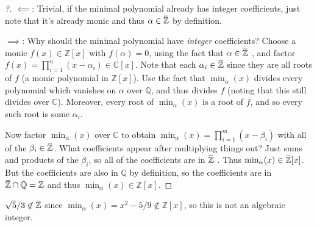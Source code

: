 \begin{proof}[?]

\(\impliedby\): Trivial, if the minimal polynomial already has integer
coefficients, just note that it's already monic and thus
\(\alpha \in \mkern 1.5mu\overline{\mkern-1.5mu{\mathbb{Z}}\mkern-1.5mu}\mkern 1.5mu\)
by definition.

\(\implies\): Why should the minimal polynomial have \emph{integer}
coefficients? Choose a monic \(f(x) \in {\mathbb{Z}}[x]\) with
\(f(\alpha) = 0\), using the fact that
\(\alpha\in \mkern 1.5mu\overline{\mkern-1.5mu{\mathbb{Z}}\mkern-1.5mu}\mkern 1.5mu\)
, and factor \(f(x) = \prod_{i=1}^n (x- \alpha_i) \in {\mathbb{C}}[x]\).
Note that each
\(\alpha_i \in \mkern 1.5mu\overline{\mkern-1.5mu{\mathbb{Z}}\mkern-1.5mu}\mkern 1.5mu\)
since they are all roots of \(f\) (a monic polynomial in
\({\mathbb{Z}}[x]\)). Use the fact that \(\min_ \alpha(x)\) divides
every polynomial which vanishes on \(\alpha\) over \({\mathbb{Q}}\), and
thus divides \(f\) (noting that this still divides over
\({\mathbb{C}}\)). Moreover, every root of \(\min_ \alpha(x)\) is a root
of \(f\), and so every such root is some \(\alpha_i\).

Now factor \(\min_ \alpha(x)\) over \({\mathbb{C}}\) to obtain
\(\min_ \alpha(x) = \prod_{i=1}^m (x - \beta_i)\) with all of the
\(\beta_i \in \mkern 1.5mu\overline{\mkern-1.5mu{\mathbb{Z}}\mkern-1.5mu}\mkern 1.5mu\).
What coefficients appear after multiplying things out? Just sums and
products of the \(\beta_i\), so all of the coefficients are in
\(\mkern 1.5mu\overline{\mkern-1.5mu{\mathbb{Z}}\mkern-1.5mu}\mkern 1.5mu\)
. Thus
\(\min_ \alpha(x) \in \mkern 1.5mu\overline{\mkern-1.5mu{\mathbb{Z}}\mkern-1.5mu}\mkern 1.5mu[x]\).
But the coefficients are also in \({\mathbb{Q}}\) by definition, so the
coefficients are in
\(\mkern 1.5mu\overline{\mkern-1.5mu{\mathbb{Z}}\mkern-1.5mu}\mkern 1.5mu\cap{\mathbb{Q}}= {\mathbb{Z}}\)
and thus \(\min_ \alpha(x) \in {\mathbb{Z}}[x]\).

\end{proof}

\begin{example}

\(\sqrt{5}/ 3 \not\in \mkern 1.5mu\overline{\mkern-1.5mu{\mathbb{Z}}\mkern-1.5mu}\mkern 1.5mu\)
since \(\min_ \alpha(x) = x^2 - 5/9 \not\in {\mathbb{Z}}[x]\), so this
is not an algebraic integer.

\end{example}

